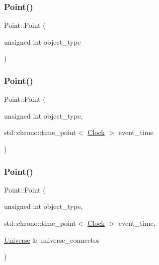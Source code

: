 \mbox{\label{classPoint_a84d29a0f72e67406901cb87c1d2f77e9}} 
\subsubsection{\texorpdfstring{Point()}{Point()}\hspace{0.1cm}{\footnotesize\ttfamily [2/4]}}
{\footnotesize\ttfamily Point\+::\+Point (\begin{DoxyParamCaption}\item[{unsigned int}]{object\+\_\+type }\end{DoxyParamCaption})\hspace{0.3cm}{\ttfamily [inline]}}

\mbox{\label{classPoint_ac3e6d30951c40e5bc5dafe6c90668b3f}} 
\subsubsection{\texorpdfstring{Point()}{Point()}\hspace{0.1cm}{\footnotesize\ttfamily [3/4]}}
{\footnotesize\ttfamily Point\+::\+Point (\begin{DoxyParamCaption}\item[{unsigned int}]{object\+\_\+type,  }\item[{std\+::chrono\+::time\+\_\+point$<$ \mbox{\hyperlink{universe_8h_a0ef8d951d1ca5ab3cfaf7ab4c7a6fd80}{Clock}} $>$}]{event\+\_\+time }\end{DoxyParamCaption})\hspace{0.3cm}{\ttfamily [inline]}}

\mbox{\label{classPoint_abbc76ed1b437c982eb607ec165ecfa47}} 
\subsubsection{\texorpdfstring{Point()}{Point()}\hspace{0.1cm}{\footnotesize\ttfamily [4/4]}}
{\footnotesize\ttfamily Point\+::\+Point (\begin{DoxyParamCaption}\item[{unsigned int}]{object\+\_\+type,  }\item[{std\+::chrono\+::time\+\_\+point$<$ \mbox{\hyperlink{universe_8h_a0ef8d951d1ca5ab3cfaf7ab4c7a6fd80}{Clock}} $>$}]{event\+\_\+time,  }\item[{\mbox{\hyperlink{classUniverse}{Universe}} \&}]{universe\+\_\+connector }\end{DoxyParamCaption})\hspace{0.3cm}{\ttfamily [inline]}}

